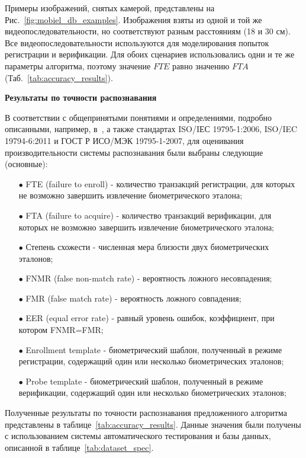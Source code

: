 Примеры изображений, снятых камерой, представлены на Рис.~\ref{fig:mobiel_db_examples}. Изображения взяты из одной и той же видеопоследовательности, но соответствуют разным расстояниям (18 и 30 см). Все видеопоследовательности используются для моделирования попыток регистрации и верификации. Для обоих сценариев использовались одни и те же параметры алгоритма, поэтому значение $FTE$ равно значению $FTA$ (Таб.~\ref{tab:accuracy_results}).

{\bf Результаты по точности распознавания}

В соответствии с общепринятыми понятиями и определениями, подробно описанными, например, в~\cite{dunstone_biosystem}, а также стандартах ISO/IЕС 19795-1:2006, ISO/IEC 19794-6:2011 и ГОСТ Р ИСО/МЭК 19795-1-2007, для оценивания производительности системы распознавания были выбраны следующие (основные):

\begin{itemize}
	\setlength\itemsep{0.01em}
	\item[$\bullet$] FTE (failure to enroll) - количество транзакций регистрации, для которых не возможно завершить извлечение биометрического эталона;
	\item[$\bullet$] FTA (failure to acquire) - количество транзакций верификации, для которых не возможно завершить извлечение биометрического эталона;
	\item[$\bullet$] Степень схожести - численная мера близости двух биометрических эталонов;
	\item[$\bullet$] FNMR (false non-match rate) - вероятность ложного несовпадения;
	\item[$\bullet$] FMR (false match rate) - вероятность ложного совпадения;
	\item[$\bullet$] EER (equal error rate) - равный уровень ошибок, коэффициент, при котором FNMR=FMR;
	\item[$\bullet$] Enrollment template - биометрический шаблон, полученный в режиме регистрации, содержащий один или несколько биометрических эталонов;
	\item[$\bullet$] Probe template - биометрический шаблон, полученный в режиме верификации, содержащий один или несколько биометрических эталонов;
\end{itemize}

Полученные результаты по точности распознавания предложенного алгоритма представлены в таблице~\ref{tab:accuracy_results}. Данные значения были получены с использованием системы автоматического тестирования и базы данных, описанной в таблице~\ref{tab:dataset_spec}.

